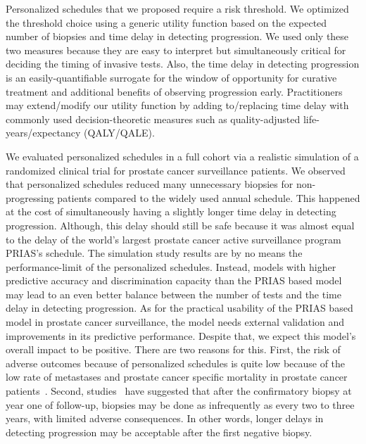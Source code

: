 \documentclass[AMA,STIX1COL]{WileyNJD-v2}
\begin{document}
Personalized schedules that we proposed require a risk threshold. We optimized the threshold choice using a generic utility function based on the expected number of biopsies and time delay in detecting progression. We used only these two measures because they are easy to interpret but simultaneously critical for deciding the timing of invasive tests. Also, the time delay in detecting progression is an easily-quantifiable surrogate for the window of opportunity for curative treatment and additional benefits of observing progression early. Practitioners may extend/modify our utility function by adding to/replacing time delay with commonly used decision-theoretic measures such as quality-adjusted life-years/expectancy (QALY/QALE).

We evaluated personalized schedules in a full cohort via a realistic simulation of a randomized clinical trial for prostate cancer surveillance patients. We observed that personalized schedules reduced many unnecessary biopsies for non-progressing patients compared to the widely used annual schedule. This happened at the cost of simultaneously having a slightly longer time delay in detecting progression. Although, this delay should still be safe because it was almost equal to the delay of the world's largest prostate cancer active surveillance program PRIAS's schedule. The simulation study results are by no means the performance-limit of the personalized schedules. Instead, models with higher predictive accuracy and discrimination capacity than the PRIAS based model may lead to an even better balance between the number of tests and the time delay in detecting progression. As for the practical usability of the PRIAS based model in prostate cancer surveillance, the model needs external validation and improvements in its predictive performance. Despite that, we expect this model's overall impact to be positive. There are two reasons for this. First, the risk of adverse outcomes because of personalized schedules is quite low because of the low rate of metastases and prostate cancer specific mortality in prostate cancer patients~\citep{bokhorst2015compliance}. Second, studies~\citep{carvalho,inoue2018comparative} have suggested that after the confirmatory biopsy at year one of follow-up, biopsies may be done as infrequently as every two to three years, with limited adverse consequences. In other words, longer delays in detecting progression may be acceptable after the first negative biopsy.
\end{document}
